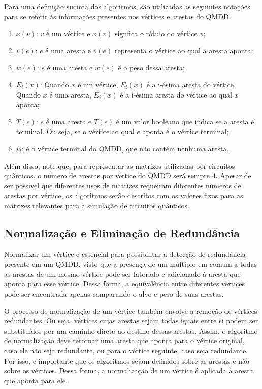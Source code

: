 Para uma definição sucinta dos algoritmos, são utilizadas as seguintes notações para se referir às informações presentes nos vértices e arestas do QMDD.

\begin{enumerate}
  \item $x(v)$: $v$ é um vértice e $x(v)$ signfica o rótulo do vértice $v$;
  \item $v(e)$: $e$ é uma aresta e $v(e)$ representa o vértice ao qual a aresta aponta;
  \item $w(e)$: $e$ é uma aresta e $w(e)$ é o peso dessa aresta;
  \item $E_i(x)$: Quando $x$ é um vértice, $E_i(x)$ é a i-ésima aresta do vértice. Quando $x$ é uma aresta, $E_i(x)$ é a i-ésima aresta do vértice ao qual $x$ aponta;
  \item $T(e)$: $e$ é uma aresta e $T(e)$ é um valor booleano que indica se a aresta é terminal. Ou seja, se o vértice ao qual $e$ aponta é o vértice terminal;
  \item $v_t$: é o vértice terminal do QMDD, que não contém nenhuma aresta.

\end{enumerate}


Além disso, note que, para representar as matrizes utilizadas por circuitos quânticos, o número de arestas por vértice do QMDD será sempre 4. Apesar de ser possível que diferentes usos de matrizes requeiram diferentes números de arestas por vértice, os algoritmos serão descritos com os valores fixos para as matrizes relevantes para a simulação de circuitos quânticos.

\subsection{Normalização e Eliminação de Redundância}

Normalizar um vértice é essencial para possibilitar a detecção de redundância presente em um QMDD, visto que a presença de um múltiplo em comum a todas as arestas de um mesmo vértice pode ser fatorado e adicionado à aresta que aponta para esse vértice. Dessa forma, a equivalência entre diferentes vértices pode ser encontrada apenas comparando o alvo e peso de suas arestas.

O processo de normalização de um vértice também envolve a remoção de vértices redundantes. Ou seja, vértices cujas arestas sejam todas iguais entre si podem ser substituídos por um caminho direto ao destino dessas arestas. Assim, o algoritmo de normalização deve retornar uma aresta que aponta para o vértice original, caso ele não seja redundante, ou para o vértice seguinte, caso seja redundante. Por isso, é importante que os algoritmos sejam definidos sobre as arestas e não sobre os vértices. Dessa forma, a normalização de um vértice é aplicada à aresta que aponta para ele.

